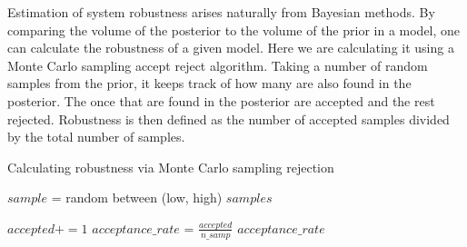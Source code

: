 Estimation of system robustness arises naturally from Bayesian methods. By comparing the volume of the posterior to the volume of the prior in a model, one can calculate the robustness of a given model. 
Here we are calculating it using a Monte Carlo sampling accept reject algorithm. Taking a number of random samples from the prior, it keeps track of how many are also found in the posterior. The once that are found in the posterior are accepted and the rest rejected. Robustness is then defined as the number of accepted samples divided by the total number of samples.
\begin{algorithm}
	\label{alg:robustness}
  \caption{Calculating robustness via Monte Carlo sampling rejection }
 \begin{algorithmic}[1]
    \Statex
     
        	\State $sample$ = random between (low, high)  
      	\EndFor
      \EndFor
      \State \Return $samples$
    \EndFunction
    \Statex
    
    	
    	\EndFor
    	
    			\Else
    			\EndIf
    		\EndFor
    			\State $accepted += 1$
    		\EndIf
    	\EndFor
    	\State $acceptance\_rate$ = $\frac{accep
    	ted}{n\_samp}$
    \State \Return $acceptance\_rate$
    \EndFunction
    
  \end{algorithmic}

\end{algorithm}








